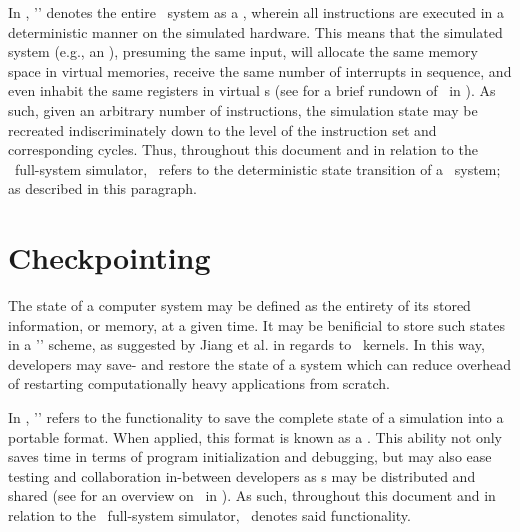In \dvttermsimics , '\dvttermdeterministicexecution ' denotes the entire \dvttermtarget\ system as a \dvttermdeterministicalgorithm , wherein all instructions are executed in a deterministic manner on the simulated hardware.
This means that the simulated system (e.g., an \dvttermos ), presuming the same input, will allocate the same memory space in virtual memories, receive the same number of interrupts in sequence, and even inhabit the same registers in virtual \dvttermcpu s (see  for a brief rundown of \dvttermdeterministicexecution\ in \dvttermsimics ).
As such, given an arbitrary number of instructions, the simulation state may be recreated indiscriminately down to the level of the instruction set and corresponding cycles.
Thus, throughout this document and in relation to the \dvttermsimics\ full-system simulator, \dvttermdeterministicexecution\ refers to the deterministic state transition of a \dvttermtarget\ system; as described in this paragraph.

\section*{Checkpointing}
\label{sec:background_checkpointing}

The state of a computer system may be defined as the entirety of its stored information, or memory, at a given time.
It may be benificial to store such states in a '\dvttermcheckpointrestart ' scheme, as suggested by Jiang et al. in regards to \dvttermcuda\ kernels.
In this way, developers may save- and restore the state of a system which can reduce overhead of restarting computationally heavy applications from scratch.

In \dvttermsimics , '\dvttermcheckpointing ' refers to the functionality to save the complete state of a simulation into a portable format.
When applied, this format is known as a \dvttermcheckpoint .
This ability not only  saves time in terms of program initialization and debugging, but may also ease testing and collaboration in-between developers as \dvttermcheckpoint s may be distributed and shared (see  for an overview on \dvttermcheckpointing\ in \dvttermsimics ).
As such, throughout this document and in relation to the \dvttermsimics\ full-system simulator, \dvttermcheckpointing\ denotes said functionality.

